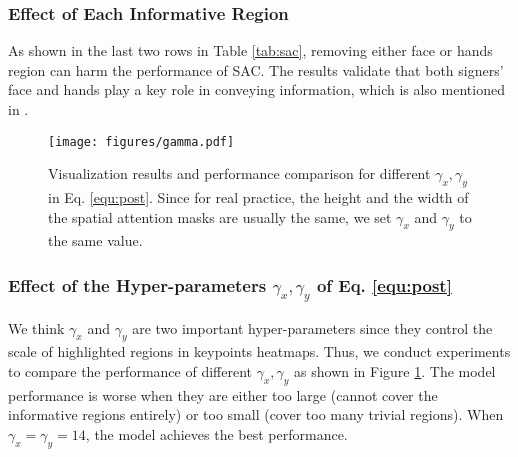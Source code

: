 \documentclass[acmsmall,screen]{acmart}
\begin{document}
\subsubsection{Effect of Each Informative Region}
As shown in the last two rows in Table \ref{tab:sac}, removing either face or hands region can harm the performance of SAC. The results validate that both signers' face and hands play a key role in conveying information, which is also mentioned in \cite{stmc, koller2020quantitative}.


\begin{figure}[!t]
\centering
\texttt{[image: figures/gamma.pdf]}
\caption{Visualization results and performance comparison for different $\gamma_x, \gamma_y$ in Eq. \ref{equ:post}. Since for real practice, the height and the width of the spatial attention masks are usually the same, we set $\gamma_x$ and $\gamma_y$ to the same value.}
\label{fig:gamma}
\end{figure}

\subsubsection{Effect of the Hyper-parameters $\gamma_x, \gamma_y$ of Eq. \ref{equ:post}}
\label{sec:gamma}
We think $\gamma_x$ and $\gamma_y$ are two important hyper-parameters since they control the scale of highlighted regions in keypoints heatmaps.
Thus, we conduct experiments to compare the performance of different $\gamma_x, \gamma_y$ as shown in Figure \ref{fig:gamma}. 
The model performance is worse when they are either too large (cannot cover the informative regions entirely) or too small (cover too many trivial regions).
When $\gamma_x=\gamma_y=14$, the model achieves the best performance.
\end{document}
